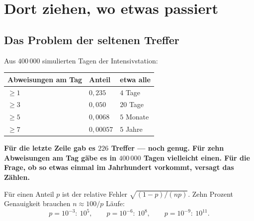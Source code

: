 \chapter{Dort ziehen, wo etwas passiert}

\section{Das Problem der seltenen Treffer}

\begin{merksatz}
Aus $400\,000$ simulierten Tagen der Intensivstation:

\begin{center}
{\small
\renewcommand{\arraystretch}{1.48}
\begin{tabular}{@{}P{3.6cm}P{2.0cm}P{2.6cm}@{}}
\toprule
\textbf{Abweisungen am Tag} & \textbf{Anteil} & \textbf{etwa alle}\\
\midrule
$\ge1$ & $0{,}235$ & $4$ Tage\\
$\ge3$ & $0{,}050$ & $20$ Tage\\
$\ge5$ & $0{,}0068$ & $5$ Monate\\
$\ge7$ & $0{,}00057$ & $5$ Jahre\\
\bottomrule
\end{tabular}}
\end{center}

\begin{center}
\begin{minipage}{0.9\textwidth}
\textbf{Für die letzte Zeile gab es $226$ Treffer --- noch genug. Für zehn Abweisungen am Tag gäbe es in $400\,000$ Tagen vielleicht einen. Für die Frage, ob so etwas einmal im Jahrhundert vorkommt, versagt das Zählen.}
\end{minipage}
\end{center}

Für einen Anteil $p$ ist der relative Fehler $\sqrt{(1-p)/(np)}$. Zehn Prozent Genauigkeit brauchen $n \approx 100/p$ Läufe:
\[ p = 10^{-3}:\ 10^{5}, \qquad p = 10^{-6}:\ 10^{8}, \qquad p = 10^{-9}:\ 10^{11} . \]

\begin{center}
\begin{minipage}{0.88\textwidth}
\end{minipage}
\end{center}
\end{merksatz}

